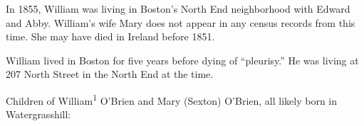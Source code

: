 In 1855, William was living in Boston's North End neighborhood with Edward and Abby.\cite{Census1855William:2,Wards:1} William's wife Mary does not appear in any census records from this time. She may have died in Ireland before 1851.

William lived in Boston for five years before dying of ``pleurisy.'' He was living at 207 North Street in the North End at the time.\cite{William1OBrienDeath:2}

\begin{KidsIntro}
	Children of William\textsuperscript{1} O'Brien and Mary (Sexton) O'Brien, all likely born in Watergrasshill:
\end{KidsIntro}

